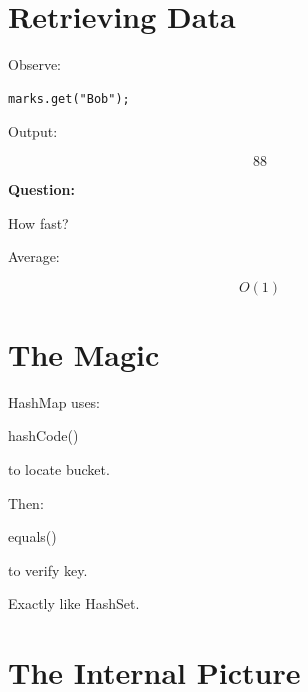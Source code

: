 \documentclass[11pt,a4paper]{book}
\begin{document}

\section{Retrieving Data}

Observe:

\begin{verbatim} 
marks.get("Bob");
\end{verbatim}


Output:

\[
88
\]


\textbf{\textbf{Question:}}

How fast?


Average:

\[
O(1)
\]


\section{The Magic}

HashMap uses:


hashCode()


to locate bucket.


Then:


equals()


to verify key.


Exactly like HashSet.


\section{The Internal Picture}
\end{document}
